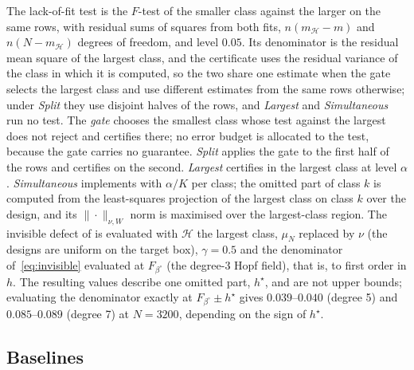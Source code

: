 The lack-of-fit test is the $F$-test of the smaller class against the larger
on the same rows, with residual sums of squares from both fits,
$n(m_{\mathcal H}-m)$ and $n(N - m_{\mathcal H})$ degrees of freedom, and
level $0.05$. Its denominator is the residual mean square of the largest
class, and the certificate uses the residual variance of the class in which it
is computed, so the two share one estimate when the gate selects the largest
class and use different estimates from the same rows otherwise; under
\emph{Split} they use disjoint halves of the rows, and \emph{Largest} and
\emph{Simultaneous} run no test. The
\emph{gate} chooses the smallest class whose test against the largest does not
reject and certifies there; no error budget is allocated to the test, because
the gate carries no guarantee. \emph{Split} applies the gate to the first half
of the rows and certifies on the second. \emph{Largest} certifies in the
largest class at level $\alpha$. \emph{Simultaneous} implements
 with $\alpha/K$ per class; the omitted part of class $k$
is computed from the least-squares projection of the largest class on class
$k$ over the design, and its $\|\cdot\|_{\nu,W}$ norm is maximised over the
largest-class region. The invisible defect of  is evaluated
with $\mathcal H$ the largest class, $\mu_N$ replaced by $\nu$ (the designs are
uniform on the target box), $\gamma = 0.5$ and the denominator
of~\eqref{eq:invisible} evaluated at $F_{\beta^\circ}$ (the degree-3 Hopf
field), that is, to first order in $h$. The resulting values describe one
omitted part, $h^\star$, and are not upper bounds; evaluating the denominator
exactly at $F_{\beta^\circ} \pm h^\star$ gives $0.039$--$0.040$ (degree 5) and
$0.085$--$0.089$ (degree 7) at $N = 3200$, depending on the sign of $h^\star$.

\subsection{Baselines}
\label{app:baselines}

